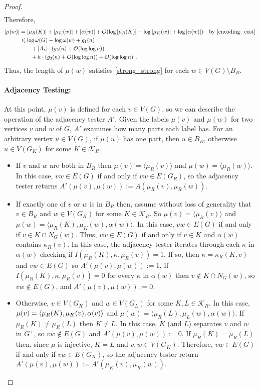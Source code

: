 \documentclass{patmorin}
\let\eqref\cref
\renewcommand{\le}{\leqslant}
\newcommand{\Oh}{\mathcal{O}}
\begin{document}
\begin{proof}
\begin{align*}
    \end{align*}
    Therefore,
    \begin{align*}
      |\mu(w)|
        & =|\mu_R(K)|+|\mu_K(w)|+|\alpha(w)|+ \Oh(\log|\mu_R(K)|+\log|\mu_K(w)|+\log|\alpha(w)|)
        & \text{by \eqref{encoding_cost}} \\
        & \le \log \omega(G) - \log\omega(w) + g_1(n)\\
        & \qquad {} + |A_z|\cdot (g_2(n)+\Oh(\log\log n))\\
        & \qquad {} + h\cdot (g_3(n) + \Oh(\log\log n)) + \Oh(\log\log n)\enspace.
    \end{align*}
    Thus, the length of $\mu(w)$ satisfies \eqref{strong_strong} for each $w\in V(G)\setminus B_R$.

    \paragraph{Adjacency Testing:}  At this point, $\mu(v)$ is defined for each $v\in V(G)$, so we can describe the operation of the adjacency tester $A'$.
    Given the labels $\mu(v)$ and $\mu(w)$ for two vertices $v$ and $w$ of $G$, $A'$ examines how many parts each label has.
    For an arbitrary vertex $u\in V(G)$, if $\mu(u)$ has one part, then $u\in B_R$,
    otherwise $u\in V(G_K)$ for some $K\in\mathcal{K}_R$.
    \begin{itemize}
      \item If $v$ and $w$ are both in $B_R$ then $\mu(v)=\langle\mu_R(v)\rangle$ and $\mu(w)=\langle\mu_R(w)\rangle$.  In this case, $vw\in E(G)$ if and only if $vw\in E(G_R)$, so the adjacency tester returns $A'(\mu(v),\mu(w)):=A(\mu_R(v),\mu_R(w))$.
      \item If exactly one of $v$ or $w$ is in $B_R$ then, assume without loss of generality that $v\in B_R$ and $w\in V(G_K)$ for some $K\in\mathcal{K}_R$.
      So $\mu(v)=\langle\mu_R(v)\rangle$ and $\mu(w)=\langle\mu_R(K),\mu_K(w),\alpha(w)\rangle$.
      In this case, $vw\in E(G)$ if and only if $v\in K\cap N_G(w)$.  Thus, $vw\in E(G)$ if and only if $v\in K$ and $\alpha(w)$ contains $\kappa_R(v)$.  In this case, the adjacency tester iterates through each $\kappa$ in $\alpha(w)$ checking if $I(\mu_R(K),\kappa,\mu_R(v))=1$.  If so, then $\kappa=\kappa_R(K,v)$ and $vw\in E(G)$ so $A'(\mu(v),\mu(w)):=1$. If $I(\mu_R(K),\kappa,\mu_R(v))=0$ for every $\kappa$ in $\alpha(w)$ then $v\not\in K\cap N_G(w)$, so  $vw\not\in E(G)$, and $A'(\mu(v),\mu(w)):=0$.
      \item Otherwise, $v\in V(G_K)$ and $w\in V(G_{L})$ for some $K,L\in\mathcal{K}_R$.
      In this case, $\mu(v)=\linebreak \langle\mu_R(K),\mu_K(v),\alpha(v)\rangle$ and $\mu(w)=\langle\mu_R(L),\mu_{L}(w),\alpha(w)\rangle$.
      If $\mu_R(K)\neq\mu_R(L)$ then $K\neq L$. In this case, $K$ (and $L$) separates $v$ and $w$ in $G^+$, so $vw\not\in E(G)$ and $A'(\mu(v),\mu(w)):=0$.
      If $\mu_R(K)=\mu_R(L)$ then, since $\mu$ is injective, $K=L$ and $v,w\in V(G_K)$.  Therefore, $vw\in E(G)$ if and only if $vw\in E(G_K)$, so the adjacency tester return $A'(\mu(v),\mu(w)):=A'(\mu_{K}(v),\mu_K(w))$.
    \end{itemize}


\end{proof}
\end{document}
